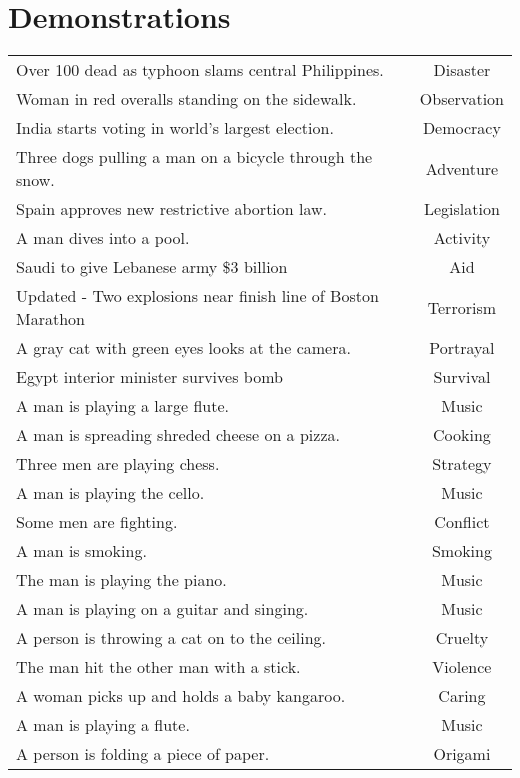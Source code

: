 \documentclass{article}
\begin{document}




\appendix




\section{Demonstrations}
\label{apx:demo}

\begin{longtable}{p{12cm}c}
Over 100 dead as typhoon slams central Philippines. & Disaster\\
Woman in red overalls standing on the sidewalk. & Observation\\
India starts voting in world's largest election. & Democracy\\
Three dogs pulling a man on a bicycle through the snow. & Adventure\\
Spain approves new restrictive abortion law. & Legislation\\
A man dives into a pool. & Activity\\
Saudi to give Lebanese army \$3 billion & Aid\\
Updated - Two explosions near finish line of Boston Marathon & Terrorism\\
A gray cat with green eyes looks at the camera. & Portrayal\\
Egypt interior minister survives bomb & Survival\\
A man is playing a large flute. & Music\\
A man is spreading shreded cheese on a pizza. & Cooking\\
Three men are playing chess. & Strategy\\
A man is playing the cello. & Music\\
Some men are fighting. & Conflict\\
A man is smoking. & Smoking\\
The man is playing the piano. & Music\\
A man is playing on a guitar and singing. & Music\\
A person is throwing a cat on to the ceiling. & Cruelty\\
The man hit the other man with a stick. & Violence\\
A woman picks up and holds a baby kangaroo. & Caring\\
A man is playing a flute. & Music\\
A person is folding a piece of paper. & Origami\\

\end{longtable}
\end{document}
